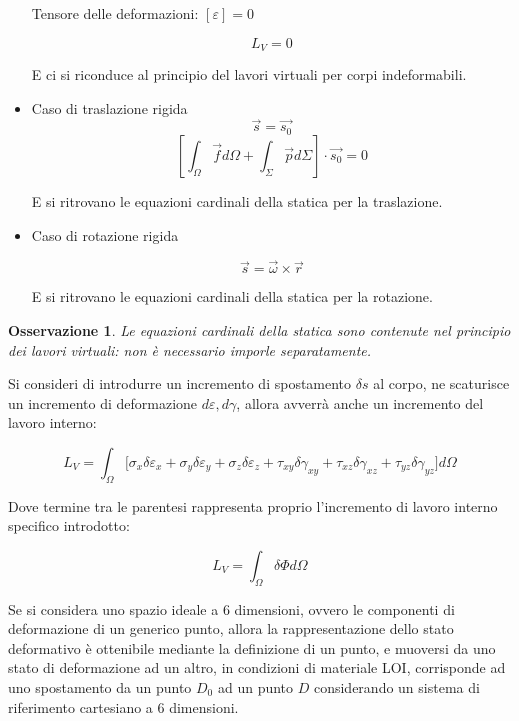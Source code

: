 \documentclass{article}
\newtheorem*{oss}{Osservazione}
\begin{document}
\begin{adjustwidth}{2in}{}
\begin{itemize}
		Tensore delle deformazioni: $[\varepsilon] = 0$
		
		\[L_V = 0\]
		
		E ci si riconduce al principio del lavori virtuali per corpi indeformabili. 
		
		\item Caso di traslazione rigida
		\[\vec{s} = \vec{s_0}\]
		\[ \left[ \int_{\Omega} \vec{f}d\Omega + \int_{\Sigma}\vec{p}d\Sigma \right] \cdot \vec{s_0} = 0 \]
		
		E si ritrovano le equazioni cardinali della statica per la traslazione.
		
		\item Caso di rotazione rigida
		
		\[  \vec{s} = \vec{\omega} \times \vec{r}\]
		
		E si ritrovano le equazioni cardinali della statica per la rotazione. 
	\end{itemize}

	\begin{oss}
		Le equazioni cardinali della statica sono contenute nel principio dei lavori virtuali:
	non è necessario imporle separatamente. \newline
	\end{oss}

	Si consideri di introdurre un incremento di spostamento $\delta s$ al corpo, ne scaturisce un incremento di deformazione $d\varepsilon, d
	\gamma$, allora avverrà anche un incremento del lavoro interno:
	
	 \[ 
	L_V = \int_{\Omega}  \Bigg[  \sigma_x \delta\varepsilon_x + \sigma_y \delta\varepsilon_y + \sigma_z \delta\varepsilon_z 
		+\tau_{xy} \delta\gamma_{xy} + \tau_{xz} \delta\gamma_{xz} + \tau_{yz} \delta\gamma_{yz} \Bigg] d\Omega
	\]
	
	Dove termine tra le parentesi rappresenta proprio l'incremento di lavoro interno specifico introdotto:
	
	\[
	L_V = \int_{\Omega} \delta \Phi d\Omega
	\]
	
	Se si considera uno spazio ideale a 6 dimensioni, ovvero le componenti di deformazione di un generico punto, allora la rappresentazione dello stato deformativo è ottenibile mediante la definizione di un punto, e muoversi da uno stato di deformazione ad un altro, in condizioni di materiale LOI, corrisponde ad uno spostamento da un punto $D_0$ ad un punto $D$ considerando un sistema di riferimento cartesiano a 6 dimensioni. \newline 
	

\end{adjustwidth}
\end{document}
